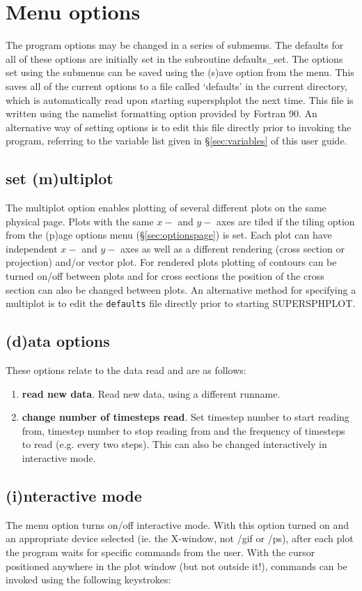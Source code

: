 \documentclass[a4paper,12pt]{article}
\begin{document}
\section{Menu options}
 The program options may be changed in a series of submenus. The defaults for all of
these options are initially set in the subroutine defaults\_set. The options set using
the submenus can be saved using the (s)ave option from the menu. This saves all of
the current options to a file called `defaults' in the current directory, which is
automatically read upon starting supersphplot the next time. This file is written using
the namelist formatting option provided by Fortran 90. An alternative way of setting
options is to edit this file directly prior to invoking the program, referring to the
variable list given in \S\ref{sec:variables} of this user guide. 

\subsection{set (m)ultiplot}
 The multiplot option enables plotting of several different plots on the same
physical page. Plots with the same $x-$ and $y-$ axes are tiled if the tiling
option from the (p)age options menu (\S\vref{sec:optionspage}) is set. Each plot
can have independent $x-$ and $y-$ axes as well as a different rendering (cross
section or projection) and/or vector plot. For rendered plots plotting of
contours can be turned on/off between plots and for cross sections the position of
the cross section can also be changed between plots. An alternative method for
specifying a multiplot is to edit the \verb+defaults+ file directly prior to
starting SUPERSPHPLOT.

\subsection{(d)ata options}
These options relate to the data read and are as follows:
\begin{enumerate}
\item \textbf{read new data}. Read new data, using a different runname.
\item \textbf{change number of timesteps read}. Set timestep number to start
reading from, timestep number to stop reading from and the frequency of
timesteps to read (e.g. every two steps). This can also be changed interactively in
interactive mode.
\end{enumerate}

\subsection{(i)nteractive mode}
 The menu option turns on/off interactive mode. With this option turned on and
an appropriate device selected (ie. the X-window, not /gif or /ps), after
each plot the program waits for specific commands from the user. With the cursor
positioned anywhere in the plot window (but not outside it!), commands can be invoked using the
following keystrokes:
\end{document}
